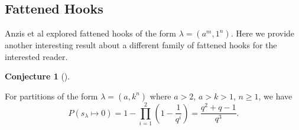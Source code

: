 \documentclass[numbers=enddot,12pt,final,onecolumn,notitlepage]{scrartcl}%
\theoremstyle{definition}
\newtheorem{conj}[theo]{Conjecture}
\newenvironment{conjecture}[1][]
{\begin{conj}[#1]\begin{leftbar}}
{\end{leftbar}\end{conj}}
\let\prodnonlimits\prod
\renewcommand{\prod}{\prodnonlimits\limits}
\renewcommand{\geq}{\geqslant}
\theoremstyle{plainsl}
\begin{document}
\subsection{Fattened Hooks}
Anzis et al \cite{Anzis18} explored fattened hooks of the form $\lambda = (a^m,1^n)$. Here we provide another interesting result about a different family of fattened hooks for the interested reader. 

\begin{conjecture}
For partitions of the form $\lambda = (a, k^n)$ where $a>2$, $a>k>1$, $n\geq1$, we have
\[
P(s_{\lambda} \longmapsto 0) = 1-\prod_{i=1}^{2} \left(  1-\dfrac{1}{q^{i}}\right) = \dfrac{q^2+q-1}{q^3} .
\]

\end{conjecture}

\printbibliography
\end{document}
